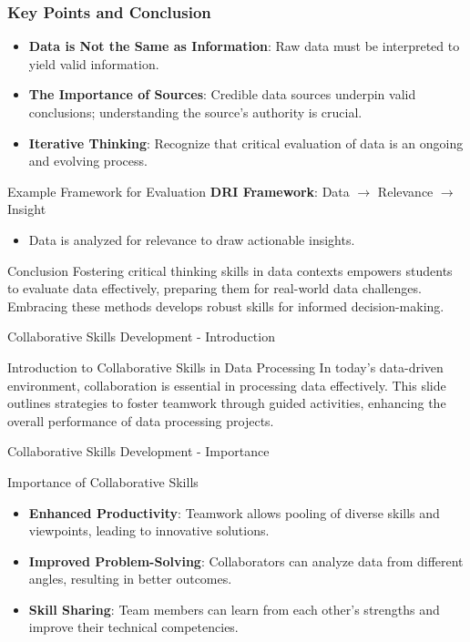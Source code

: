 \documentclass[aspectratio=169]{beamer}
\begin{document}
\begin{frame}[fragile]
    \frametitle{Key Points and Conclusion}
    \begin{itemize}
        \item \textbf{Data is Not the Same as Information}: Raw data must be interpreted to yield valid information.
        \item \textbf{The Importance of Sources}: Credible data sources underpin valid conclusions; understanding the source's authority is crucial.
        \item \textbf{Iterative Thinking}: Recognize that critical evaluation of data is an ongoing and evolving process.
    \end{itemize}
    
    \begin{block}{Example Framework for Evaluation}
        \textbf{DRI Framework}: Data $\to$ Relevance $\to$ Insight
        \begin{itemize}
            \item Data is analyzed for relevance to draw actionable insights.
        \end{itemize}
    \end{block}

    \begin{block}{Conclusion}
        Fostering critical thinking skills in data contexts empowers students to evaluate data effectively, preparing them for real-world data challenges. Embracing these methods develops robust skills for informed decision-making.
    \end{block}
\end{frame}

\begin{frame}[fragile]{Collaborative Skills Development - Introduction}
    \begin{block}{Introduction to Collaborative Skills in Data Processing}
        In today's data-driven environment, collaboration is essential in processing data effectively. This slide outlines strategies to foster teamwork through guided activities, enhancing the overall performance of data processing projects.
    \end{block}
\end{frame}

\begin{frame}[fragile]{Collaborative Skills Development - Importance}
    \begin{block}{Importance of Collaborative Skills}
        \begin{itemize}
            \item \textbf{Enhanced Productivity}: Teamwork allows pooling of diverse skills and viewpoints, leading to innovative solutions.
            \item \textbf{Improved Problem-Solving}: Collaborators can analyze data from different angles, resulting in better outcomes.
            \item \textbf{Skill Sharing}: Team members can learn from each other's strengths and improve their technical competencies.
        \end{itemize}
    \end{block}
\end{frame}
\end{document}
